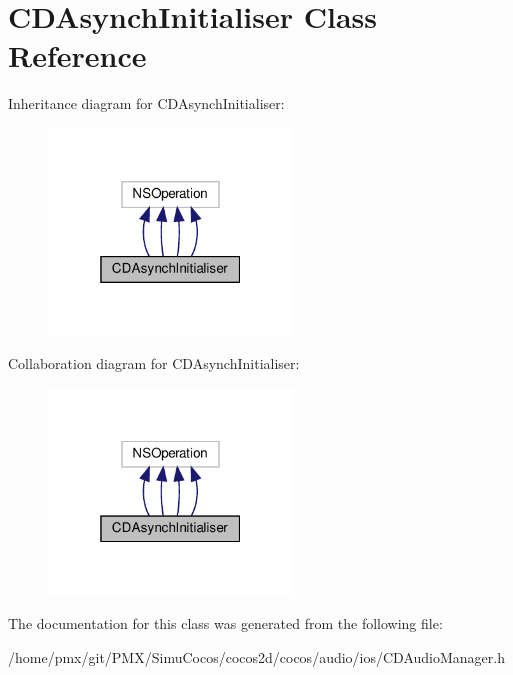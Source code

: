 \hypertarget{interfaceCDAsynchInitialiser}{}\section{C\+D\+Asynch\+Initialiser Class Reference}
\label{interfaceCDAsynchInitialiser}


Inheritance diagram for C\+D\+Asynch\+Initialiser\+:
\nopagebreak
\begin{figure}[H]
\begin{center}
\leavevmode
\includegraphics[width=184pt]{interfaceCDAsynchInitialiser__inherit__graph}
\end{center}
\end{figure}


Collaboration diagram for C\+D\+Asynch\+Initialiser\+:
\nopagebreak
\begin{figure}[H]
\begin{center}
\leavevmode
\includegraphics[width=184pt]{interfaceCDAsynchInitialiser__coll__graph}
\end{center}
\end{figure}


The documentation for this class was generated from the following file\+:\begin{DoxyCompactItemize}
\item 
/home/pmx/git/\+P\+M\+X/\+Simu\+Cocos/cocos2d/cocos/audio/ios/C\+D\+Audio\+Manager.\+h\end{DoxyCompactItemize}
